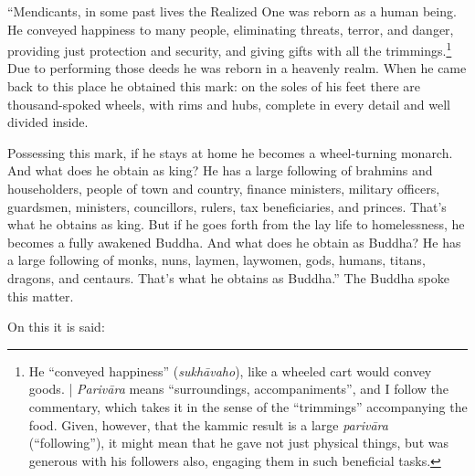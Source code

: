 \documentclass[12pt,openany]{book}%
\begin{document}
“Mendicants, in some past lives the Realized One was reborn as a human being. He conveyed happiness to many people, eliminating threats, terror, and danger, providing just protection and security, and giving gifts with all the trimmings.\footnote{He “conveyed happiness” (\textit{\textsanskrit{sukhāvaho}}), like a wheeled cart would convey goods. | \textit{\textsanskrit{Parivāra}} means “surroundings, accompaniments”, and I follow the commentary, which takes it in the sense of the “trimmings” accompanying the food. Given, however, that the kammic result is a large \textit{\textsanskrit{parivāra}} (“following”), it might mean that he gave not just physical things, but was generous with his followers also, engaging them in such beneficial tasks. } Due to performing those deeds he was reborn in a heavenly realm. When he came back to this place he obtained this mark: on the soles of his feet there are thousand-spoked wheels, with rims and hubs, complete in every detail and well divided inside. 

Possessing this mark, if he stays at home he becomes a wheel-turning monarch. And what does he obtain as king? He has a large following of brahmins and householders, people of town and country, finance ministers, military officers, guardsmen, ministers, councillors, rulers, tax beneficiaries, and princes. That’s what he obtains as king. But if he goes forth from the lay life to homelessness, he becomes a fully awakened Buddha. And what does he obtain as Buddha? He has a large following of monks, nuns, laymen, laywomen, gods, humans, titans, dragons, and centaurs. That’s what he obtains as Buddha.” The Buddha spoke this matter. 

On this it is said: 
\end{document}
